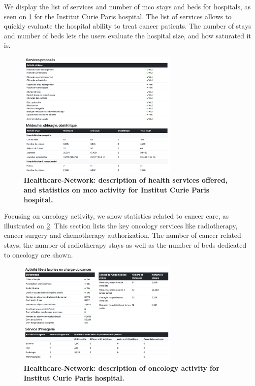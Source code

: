 We display the list of services and number of \ac{mco} stays and beds for hospitals, as seen on \cref{fig:hn-curie-services} for the Institut Curie Paris hospital. The list of services allows to quickly evaluate the hospital ability to treat cancer patients. The number of stays and number of beds lets the users evaluate the hospital size, and how saturated it is.

\begin{figure}[H]
    \includegraphics[width=0.7\textwidth]{images/healthcare-network/curie-services.png}
    \centering
    \caption{
        \textbf{Healthcare-Network: description of health services offered, and statistics on \ac{mco} activity for Institut Curie Paris hospital.}
    }
    \label{fig:hn-curie-services}
\end{figure}

Focusing on oncology activity, we show statistics related to cancer care, as illustrated on \cref{fig:hn-curie-cancero}. This section lists the key oncology services like radiotherapy, cancer surgery and chemotherapy authorization. The number of cancer related stays, the number of radiotherapy stays as well as the number of beds dedicated to oncology are shown.

\begin{figure}[H]
    \includegraphics[width=0.7\textwidth]{images/healthcare-network/curie-cancero.png}
    \centering
    \caption{
        \textbf{Healthcare-Network: description of oncology activity for Institut Curie Paris hospital.}
    }
    \label{fig:hn-curie-cancero}
\end{figure}

